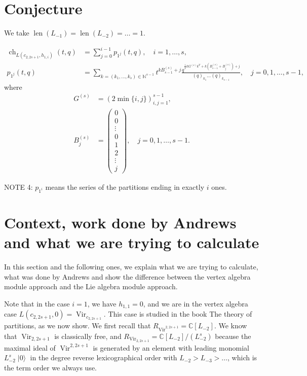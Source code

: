 \documentclass[a4paper, 12pt, reqno]{amsart}
\DeclareMathOperator{\Vir}{Vir}
\DeclareMathOperator{\ch}{ch}
\DeclareMathOperator{\len}{len}
\DeclareMathOperator{\vac}{|0\rangle}
\begin{document}
\section{Conjecture}
\label{sec:conjecture}

We take $\len(L_{-1}) = \len(L_{-2}) = \dots = 1$.

\begin{align*}
  \ch_{L(c_{2, 2s + 1}, h_{1, i})}(t, q) &= \sum_{j = 0}^{i - 1}p_{1^j}(t, q), \quad i = 1, \dots, s, \\
  p_{1^j}(t, q) &= \sum_{k = (k_1, \dots, k_s) \in \mathbb{N}^{s - 1}}t^{kB^{(s)}_{s - 1} + j}\frac{q^{\frac{1}{2}kG^{(s)}k^T + k(B^{(s)}_{s - 1} + B^{(s)}_j) + j}}{(q)_{k_1}\dots(q)_{k_{s - 1}}}, \quad j = 0, 1, \dots, s - 1,
\end{align*}
where
\begin{align*}
  G^{(s)} &= (2\min\{i, j\})_{i, j = 1}^{s - 1}, \\
  B^{(s)}_j &=
              \left(\begin{smallmatrix}
                0 \\
                0 \\
                \vdots \\
                0 \\
                1 \\
                2 \\
                \vdots \\
                j
              \end{smallmatrix}\right), \quad j = 0, 1, \dots, s - 1.  
\end{align*}

NOTE 4: $p_{1^i}$ means the series of the partitions ending in exactly $i$ ones.

\section{Context, work done by Andrews and what we are trying to calculate}
\label{sec:context-work-done}

In this section and the following ones, we explain what we are trying to calculate, what was done by Andrews and show the difference between the vertex algebra module approach and the Lie algebra module approach.

Note that in the case $i = 1$, we have $h_{1, 1} = 0$, and we are in the vertex algebra case $L(c_{2, 2s + 1}, 0) = \Vir_{c_{2, 2s + 1}}$.
This case is studied in the book The theory of partitions, as we now show.
We first recall that $R_{\Vir^{2, 2s + 1}} = \mathbb{C}[L_{-2}]$.
We know that $\Vir_{2, 2s + 1}$ is classically free, and $R_{\Vir_{2, 2s + 1}} = \mathbb{C}[L_{-2}]/(L_{-2}^s)$ because the maximal ideal of $\Vir^{2, 2s + 1}$ is generated by an element with leading monomial $L_{-2}^s\vac$ in the degree reverse lexicographical order with $L_{-2} > L_{-3} > \dots$, which is the term order we always use.
\end{document}
